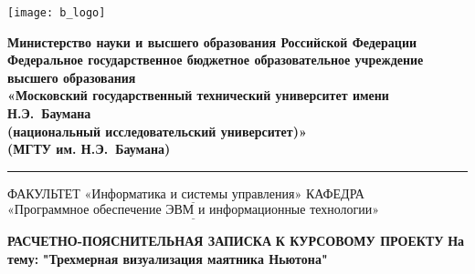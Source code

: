 


\noindent \begin{minipage}{0.15\textwidth}
	\texttt{[image: b\_logo]}
\end{minipage}
\noindent\begin{minipage}{0.9\textwidth}\centering
	\textbf{Министерство науки и высшего образования Российской Федерации}\\
	\textbf{Федеральное государственное бюджетное образовательное учреждение высшего образования}\\
	\textbf{«Московский государственный технический университет имени Н.Э.~Баумана}\\
	\textbf{(национальный исследовательский университет)»}\\
	\textbf{(МГТУ им. Н.Э.~Баумана)}
\end{minipage}

\noindent\rule{18cm}{3pt}
\newline
\noindent ФАКУЛЬТЕТ $\underline{\text{«Информатика и системы управления»}}$ \newline
\noindent КАФЕДРА $\underline{\text{«Программное обеспечение ЭВМ и информационные технологии»}}$\newline


\begin{center}
	\noindent\begin{minipage}{1.2\textwidth}\centering
		\textbf{РАСЧЕТНО-ПОЯСНИТЕЛЬНАЯ ЗАПИСКА}\newline
		\textbf{К КУРСОВОМУ ПРОЕКТУ}\newline
		\textbf{На тему:}\newline
		\textbf{"Трехмерная визуализация маятника Ньютона"}\newline\newline\newline
	\end{minipage}
\end{center}




